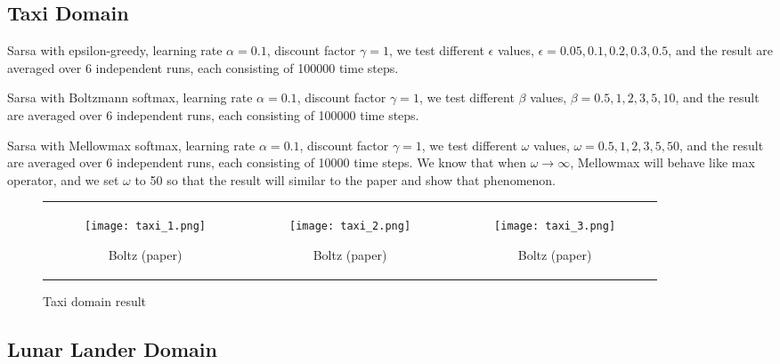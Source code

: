 \subsection{Taxi Domain}

Sarsa with epsilon-greedy, learning rate $\alpha = 0.1$, discount factor $\gamma = 1 $, we test different $\epsilon$ values, $\epsilon = 0.05, 0.1, 0.2, 0.3, 0.5$, and the result are averaged over 6 independent runs, each consisting of 100000 time steps.

Sarsa with Boltzmann softmax, learning rate $\alpha = 0.1$, discount factor $\gamma = 1 $, we test different $\beta$ values, $\beta = 0.5, 1, 2, 3, 5, 10$, and the result are averaged over 6 independent runs, each consisting of 100000 time steps.

Sarsa with Mellowmax softmax, learning rate $\alpha = 0.1$, discount factor $\gamma = 1 $, we test different $\omega$ values, $\omega = 0.5, 1, 2, 3, 5, 50$, and the result are averaged over 6 independent runs, each consisting of 10000 time steps. We know that when $\omega \to \infty$, Mellowmax will behave like max operator, and we set $\omega$ to 50 so that the result will similar to the paper and show that phenomenon.

{\centering
\begin{figure}[H]
\begin{tabular}{ccc}
\begin{subfigure}{0.32\textwidth}\centering\texttt{[image: taxi\_1.png]}\caption{Boltz (paper)}\end{subfigure}&
\begin{subfigure}{0.32\textwidth}\centering\texttt{[image: taxi\_2.png]}\caption{Boltz (paper)}\end{subfigure}&
\begin{subfigure}{0.32\textwidth}\centering\texttt{[image: taxi\_3.png]}\caption{Boltz (paper)}\end{subfigure}\\
\end{tabular}
\caption{Taxi domain result}
\end{figure}}



\subsection{Lunar Lander Domain}
